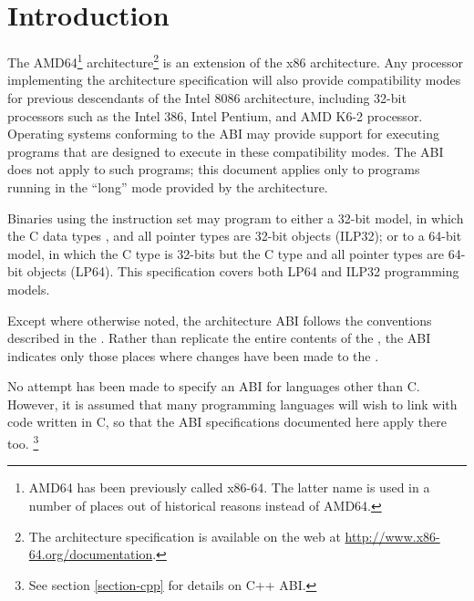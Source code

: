\chapter{Introduction\label{intro}}

The AMD64\footnote{AMD64 has been previously called x86-64.  The
  latter name is used in a number of places out of historical reasons
  instead of AMD64.}  architecture\footnote{The architecture
  specification is available on the web at
  \url{http://www.x86-64.org/documentation}.} is an extension of the
x86 architecture.  Any processor implementing the \xARCH architecture
specification will also provide compatibility modes for previous
descendants of the Intel 8086 architecture, including 32-bit
processors such as the Intel 386, Intel Pentium, and AMD K6-2
processor.  Operating systems conforming to the \xARCH ABI may provide
support for executing programs that are designed to execute in these
compatibility modes.  The \xARCH ABI does not apply to such programs;
this document applies only to programs running in the ``long'' mode
provided by the \xARCH architecture.

Binaries using the \xARCH instruction set may program to either a 32-bit
model, in which the C data types ,  and all
pointer types are 32-bit objects (ILP32); or to a 64-bit model,
in which the C  type is 32-bits but the C  type
and all pointer types are 64-bit objects (LP64). This specification
covers both LP64 and ILP32 programming models.

Except where otherwise noted, the \xARCH architecture ABI follows the
conventions described in the \intelabi.  Rather than replicate the
entire contents of the \intelabi, the \xARCH ABI indicates only those
places where changes have been made to the \intelabi.

No attempt has been made to specify an ABI for languages other than C.
However, it is assumed that many programming languages will wish to
link with code written in C, so
that the ABI specifications documented here apply there too.%
\footnote{See section \ref{section-cpp} for details on C++ ABI.}

